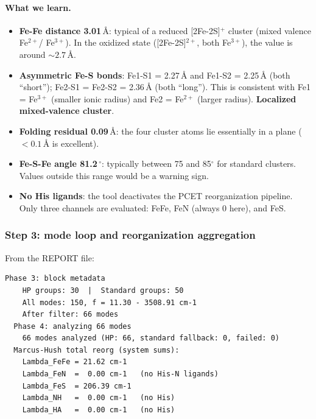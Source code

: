 \documentclass[11pt,a4paper,twoside]{article}
\providecommand{\angstrom}{\text{\AA}}    %
\theoremstyle{remark}
\begin{document}
\paragraph{What we learn.}
\begin{itemize}\setlength{\itemsep}{0pt}
  \item \textbf{Fe-Fe distance 3.01\,$\angstrom$}: typical of a
        reduced [2Fe-2S]$^{+}$ cluster (mixed valence Fe$^{2+}$/
        Fe$^{3+}$). In the oxidized state ([2Fe-2S]$^{2+}$, both
        Fe$^{3+}$), the value is around $\sim 2.7$\,$\angstrom$.
  \item \textbf{Asymmetric Fe-S bonds}:
        Fe1-S1 = 2.27\,$\angstrom$ and
        Fe1-S2 = 2.25\,$\angstrom$ (both ``short'');
        Fe2-S1 = Fe2-S2 = 2.36\,$\angstrom$ (both ``long'').
        This is consistent with Fe1 = Fe$^{3+}$ (smaller ionic
        radius) and Fe2 = Fe$^{2+}$ (larger radius).
        \textbf{Localized mixed-valence cluster}.
  \item \textbf{Folding residual 0.09\,$\angstrom$}: the four
        cluster atoms lie essentially in a plane
        ($< 0.1\,\angstrom$ is excellent).
  \item \textbf{Fe-S-Fe angle 81.2\,$^{\circ}$}: typically
        between 75 and 85$^{\circ}$ for standard clusters.
        Values outside this range would be a warning sign.
  \item \textbf{No His ligands}: the tool deactivates the PCET
        reorganization pipeline. Only three channels are
        evaluated: FeFe, FeN (always 0 here), and FeS.
\end{itemize}

\subsubsection*{Step 3: mode loop and reorganization aggregation}

From the REPORT file:
\begin{lstlisting}[basicstyle=\ttfamily\small]
  Phase 3: block metadata
    HP groups: 30  |  Standard groups: 50
    All modes: 150, f = 11.30 - 3508.91 cm-1
    After filter: 66 modes
  Phase 4: analyzing 66 modes
    66 modes analyzed (HP: 66, standard fallback: 0, failed: 0)
  Marcus-Hush total reorg (system sums):
    Lambda_FeFe = 21.62 cm-1
    Lambda_FeN  =  0.00 cm-1   (no His-N ligands)
    Lambda_FeS  = 206.39 cm-1
    Lambda_NH   =  0.00 cm-1   (no His)
    Lambda_HA   =  0.00 cm-1   (no His)
\end{lstlisting}
\end{document}
